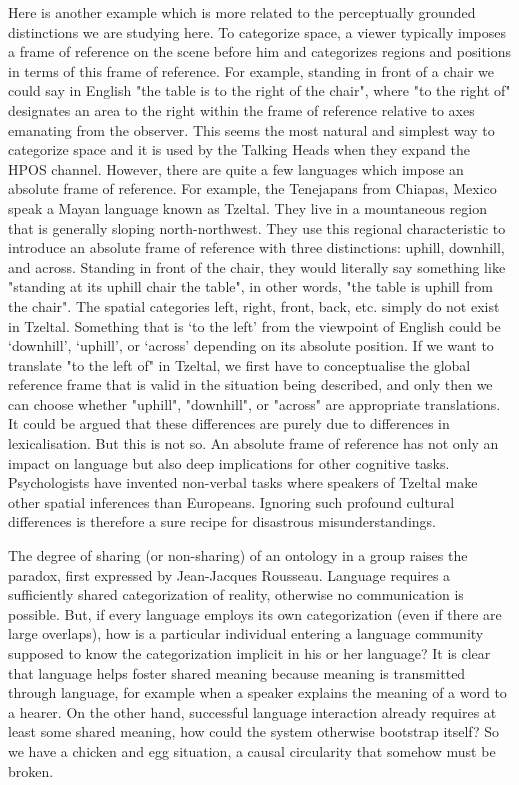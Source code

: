 Here is another example which is more related to 
the perceptually grounded distinctions we 
are studying here. To categorize space, a viewer 
typically imposes a frame of reference 
on the scene before him and categorizes regions and positions in
terms of this frame of reference. For example, standing in front of
a chair we could say in English "the table is to the right of the chair", 
where "to the right of" designates an area to the right
within the frame 
of reference relative to axes emanating from the observer. This 
seems the most natural and simplest way to categorize space
and it is used by the Talking Heads when they expand the 
HPOS channel. However, there are quite a few languages
which impose an absolute frame of reference. \cite{Levinson:2006}
For example, the Tenejapans from Chiapas, Mexico 
speak a Mayan language known as
Tzeltal. They live in a mountaneous region that is generally 
sloping north-northwest. They use this regional characteristic
to introduce an absolute frame of reference with three distinctions: 
uphill, downhill, and across. Standing in front of the chair, they 
would literally say something like
"standing at its uphill chair the table", in other words, 
"the table is uphill from the chair". 
The spatial categories left, right, front, back, etc. simply 
do not exist in Tzeltal.
Something that is `to the left' from the viewpoint
of English could be `downhill', `uphill', or `across' depending
on its absolute position. 
If we want to translate "to the left of" 
in Tzeltal, we first have to conceptualise the global reference
frame that is valid in the situation being described,  
and only then we can choose whether "uphill", "downhill", or "across"
are appropriate translations. It could be argued that 
these differences are purely due to differences in 
lexicalisation. But this is not so. 
An absolute frame of reference
has not only an impact on language but also deep implications
for other cognitive tasks. Psychologists have invented 
non-verbal tasks where speakers of Tzeltal make other spatial
inferences than Europeans. Ignoring such profound 
cultural differences is therefore a sure recipe for
disastrous misunderstandings.

The degree of sharing (or non-sharing) of an 
ontology in a group raises the paradox, first 
expressed by Jean-Jacques Rousseau. Language requires a
sufficiently shared categorization of reality, otherwise 
no communication is possible. But, if every language 
employs its own 
categorization (even if there are large overlaps), how is a
particular individual entering a language community supposed to
know the categorization implicit in his or her
language? It is clear that language 
helps foster shared meaning because meaning is transmitted 
through language, for example when a speaker explains the meaning
of a word to a hearer. On the other hand, successful 
language interaction already requires at least some shared
meaning, how could the system otherwise bootstrap itself?
So we have a chicken and egg situation, a causal 
circularity that somehow must be broken. 

